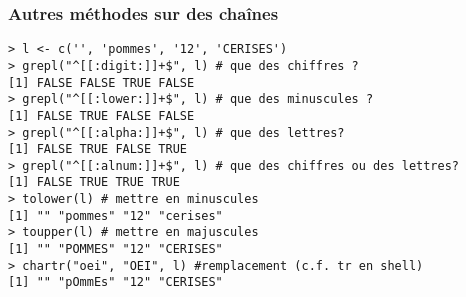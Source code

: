 \documentclass[10pt]{beamer}
\begin{document}
\begin{frame}[fragile]
  \frametitle{Autres méthodes sur des chaînes}
  \begin{lstlisting}
> l <- c('', 'pommes', '12', 'CERISES')
> grepl("^[[:digit:]]+$", l) # que des chiffres ?
[1] FALSE FALSE TRUE FALSE
> grepl("^[[:lower:]]+$", l) # que des minuscules ?
[1] FALSE TRUE FALSE FALSE
> grepl("^[[:alpha:]]+$", l) # que des lettres?
[1] FALSE TRUE FALSE TRUE
> grepl("^[[:alnum:]]+$", l) # que des chiffres ou des lettres?
[1] FALSE TRUE TRUE TRUE
> tolower(l) # mettre en minuscules
[1] "" "pommes" "12" "cerises"
> toupper(l) # mettre en majuscules
[1] "" "POMMES" "12" "CERISES"
> chartr("oei", "OEI", l) #remplacement (c.f. tr en shell)
[1] "" "pOmmEs" "12" "CERISES"
  \end{lstlisting}
\end{frame}
\end{document}
